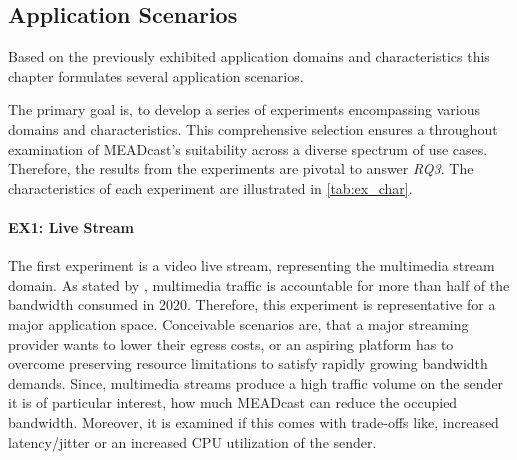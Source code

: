 \subsection{Application Scenarios} %
\label{sub:Application Scenarios}





Based on the previously exhibited application domains and characteristics this
    chapter formulates several application scenarios.

The primary goal is, to develop a series of experiments encompassing various
    domains and characteristics.
This comprehensive selection ensures a throughout examination of MEADcast's
    suitability across a diverse spectrum of use cases.
Therefore, the results from the experiments are pivotal to answer \textit{RQ3}.
The characteristics of each experiment are illustrated in
    \autoref{tab:ex_char}.

\paragraph{EX1: Live Stream} %
\label{par:EX1: Live Stream}
The first experiment is a video live stream, representing the multimedia stream
    domain.
As stated by \citeauthor{cartesian_us_bw} \cite{cartesian_us_bw}, multimedia 
    traffic is accountable for more than half of the bandwidth consumed in
    2020.
Therefore, this experiment is representative for a major application space.
Conceivable scenarios are, that a major streaming provider wants to lower their
    egress costs, or an aspiring platform has to overcome preserving resource
    limitations to satisfy rapidly growing bandwidth demands.
Since, multimedia streams produce a high traffic volume on the sender it is
    of particular interest, how much MEADcast can reduce the occupied
    bandwidth.
Moreover, it is examined if this comes with trade-offs like, increased
    latency/jitter or an increased CPU utilization of the sender.

